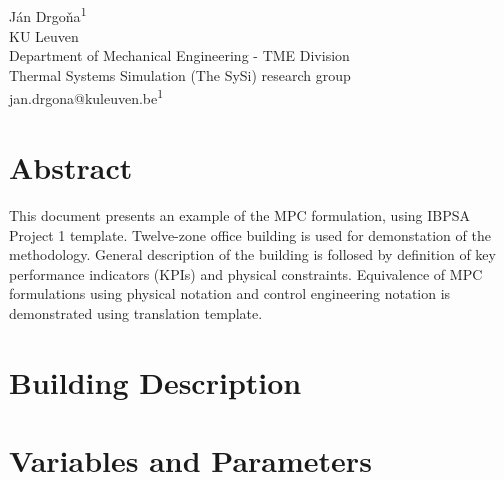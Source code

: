 \documentclass[10pt]{extarticle}
\begin{document}
	
\begin{center}
\vspace{0.2in}
\\[14pt]

{\fontsize{11pt}{1.2em}\selectfont
 J\'an Drgo\v na\textsuperscript{1}
\\[11pt]

KU Leuven\\
Department of Mechanical Engineering - TME Division\\
Thermal Systems Simulation  (The SySi) research group  \\[11pt]

jan.drgona@kuleuven.be\textsuperscript{1}\\
}
\end{center}

\vspace{0.5cm}


\section*{Abstract}

This document presents an example of the MPC formulation, using IBPSA Project 1 template.
Twelve-zone office building is used for demonstation of the methodology.
General description of the building is follosed by definition of key performance indicators (KPIs) and physical constraints.
Equivalence of MPC formulations using physical notation and control engineering notation is demonstrated using translation template.

\section{Building Description}\label{sec:building}


\section{Variables and Parameters}\label{sec:variables}
\end{document}
